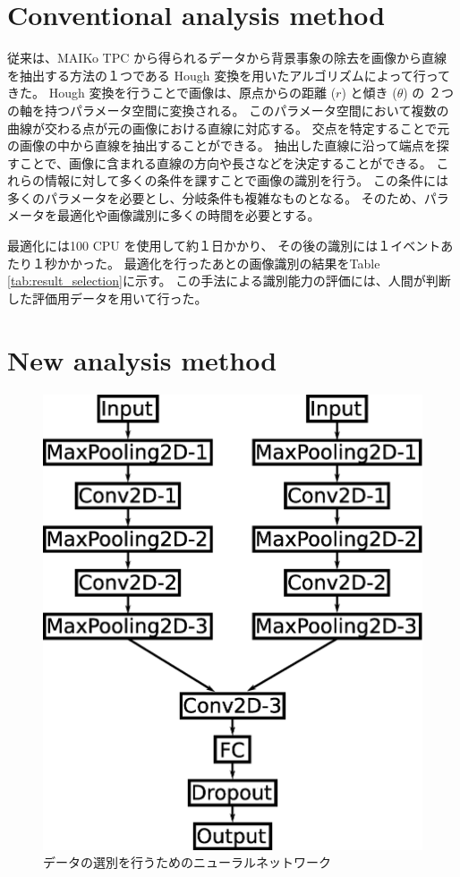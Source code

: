 \documentclass{jps-cp}
\begin{document}
\section{Conventional analysis method}
従来は、MAIKo TPC から得られるデータから背景事象の除去を画像から直線を抽出する方法の１つである
Hough 変換を用いたアルゴリズムによって行ってきた。
Hough 変換を行うことで画像は、原点からの距離 ($r$) と傾き ($\theta$) の
２つの軸を持つパラメータ空間に変換される。
このパラメータ空間において複数の曲線が交わる点が元の画像における直線に対応する。
交点を特定することで元の画像の中から直線を抽出することができる。
抽出した直線に沿って端点を探すことで、画像に含まれる直線の方向や長さなどを決定することができる。
これらの情報に対して多くの条件を課すことで画像の識別を行う。
この条件には多くのパラメータを必要とし、分岐条件も複雑なものとなる。
そのため、パラメータを最適化や画像識別に多くの時間を必要とする。

最適化には100 CPU を使用して約１日かかり、
その後の識別には１イベントあたり１秒かかった。
最適化を行ったあとの画像識別の結果をTable \ref{tab:result_selection}に示す。
この手法による識別能力の評価には、人間が判断した評価用データを用いて行った。

\section{New analysis method}

\begin{figure}
  \centering
  \includegraphics[clip, width=15zw]{eps/event_selection.eps}
  \caption{データの選別を行うためのニューラルネットワーク}
  \label{fig:selection}
\end{figure}
\end{document}
